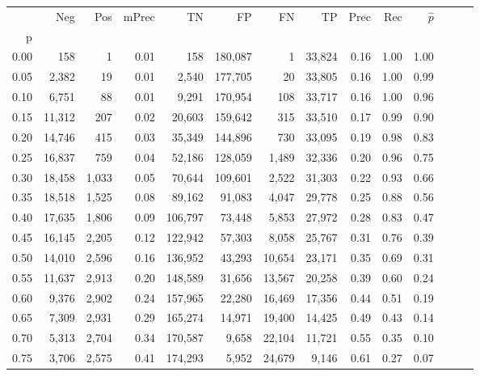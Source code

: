 \begin{tabular}{rrrrrrrrrrrrrr}
\toprule
{} &     Neg &    Pos & mPrec &       TN &       FP &      FN &      TP &  Prec &   Rec & $\hat{p}$ \\
p    &         &        &       &          &          &         &         &       &       &           \\
\midrule
0.00 &     158 &      1 &  0.01 &      158 &  180,087 &       1 &  33,824 &  0.16 &  1.00 &      1.00 \\
0.05 &   2,382 &     19 &  0.01 &    2,540 &  177,705 &      20 &  33,805 &  0.16 &  1.00 &      0.99 \\
0.10 &   6,751 &     88 &  0.01 &    9,291 &  170,954 &     108 &  33,717 &  0.16 &  1.00 &      0.96 \\
0.15 &  11,312 &    207 &  0.02 &   20,603 &  159,642 &     315 &  33,510 &  0.17 &  0.99 &      0.90 \\
0.20 &  14,746 &    415 &  0.03 &   35,349 &  144,896 &     730 &  33,095 &  0.19 &  0.98 &      0.83 \\
0.25 &  16,837 &    759 &  0.04 &   52,186 &  128,059 &   1,489 &  32,336 &  0.20 &  0.96 &      0.75 \\
0.30 &  18,458 &  1,033 &  0.05 &   70,644 &  109,601 &   2,522 &  31,303 &  0.22 &  0.93 &      0.66 \\
0.35 &  18,518 &  1,525 &  0.08 &   89,162 &   91,083 &   4,047 &  29,778 &  0.25 &  0.88 &      0.56 \\
0.40 &  17,635 &  1,806 &  0.09 &  106,797 &   73,448 &   5,853 &  27,972 &  0.28 &  0.83 &      0.47 \\
0.45 &  16,145 &  2,205 &  0.12 &  122,942 &   57,303 &   8,058 &  25,767 &  0.31 &  0.76 &      0.39 \\
0.50 &  14,010 &  2,596 &  0.16 &  136,952 &   43,293 &  10,654 &  23,171 &  0.35 &  0.69 &      0.31 \\
0.55 &  11,637 &  2,913 &  0.20 &  148,589 &   31,656 &  13,567 &  20,258 &  0.39 &  0.60 &      0.24 \\
0.60 &   9,376 &  2,902 &  0.24 &  157,965 &   22,280 &  16,469 &  17,356 &  0.44 &  0.51 &      0.19 \\
0.65 &   7,309 &  2,931 &  0.29 &  165,274 &   14,971 &  19,400 &  14,425 &  0.49 &  0.43 &      0.14 \\
0.70 &   5,313 &  2,704 &  0.34 &  170,587 &    9,658 &  22,104 &  11,721 &  0.55 &  0.35 &      0.10 \\
0.75 &   3,706 &  2,575 &  0.41 &  174,293 &    5,952 &  24,679 &   9,146 &  0.61 &  0.27 &      0.07 \\

\end{tabular}
